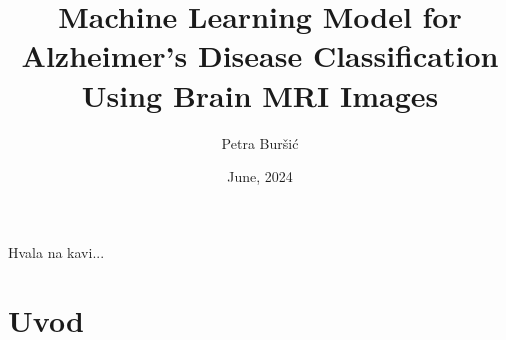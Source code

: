 \documentclass[zavrsnirad]{fer}
\title{Machine Learning Model for Alzheimer's Disease Classification Using Brain MRI Images}
\author{Petra Buršić}
\date{June, 2024}
\begin{document}
\maketitle






\begin{zahvale}
  Hvala na kavi...
\end{zahvale}


\mainmatter


\tableofcontents


\chapter{Uvod}
\label{pog:uvod}
\end{document}
